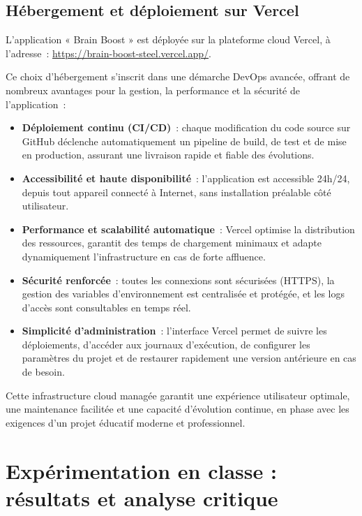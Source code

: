 \documentclass[a4paper,11pt]{report}
\begin{document}
\section{Hébergement et déploiement sur Vercel}

L'application « Brain Boost » est déployée sur la plateforme cloud Vercel, à l'adresse : \url{https://brain-boost-steel.vercel.app/}.

Ce choix d'hébergement s'inscrit dans une démarche DevOps avancée, offrant de nombreux avantages pour la gestion, la performance et la sécurité de l'application :
\begin{itemize}
    \item \textbf{Déploiement continu (CI/CD)} : chaque modification du code source sur GitHub déclenche automatiquement un pipeline de build, de test et de mise en production, assurant une livraison rapide et fiable des évolutions.
    \item \textbf{Accessibilité et haute disponibilité} : l'application est accessible 24h/24, depuis tout appareil connecté à Internet, sans installation préalable côté utilisateur.
    \item \textbf{Performance et scalabilité automatique} : Vercel optimise la distribution des ressources, garantit des temps de chargement minimaux et adapte dynamiquement l'infrastructure en cas de forte affluence.
    \item \textbf{Sécurité renforcée} : toutes les connexions sont sécurisées (HTTPS), la gestion des variables d'environnement est centralisée et protégée, et les logs d'accès sont consultables en temps réel.
    \item \textbf{Simplicité d'administration} : l'interface Vercel permet de suivre les déploiements, d'accéder aux journaux d'exécution, de configurer les paramètres du projet et de restaurer rapidement une version antérieure en cas de besoin.
\end{itemize}

Cette infrastructure cloud managée garantit une expérience utilisateur optimale, une maintenance facilitée et une capacité d'évolution continue, en phase avec les exigences d'un projet éducatif moderne et professionnel.

\chapter{Expérimentation en classe : résultats et analyse critique}
\end{document}
